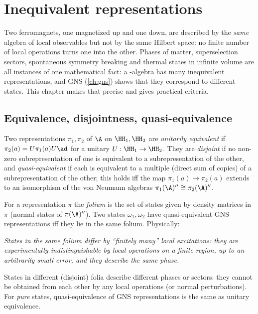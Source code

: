 \chapter{Inequivalent representations}\label{ch:inequiv}

\begin{physmotiv}
Two ferromagnets, one magnetized up and one down, are described by the \emph{same} algebra of local observables but not by the same Hilbert space: no finite number of local operations turns one into the other. Phases of matter, superselection sectors, spontaneous symmetry breaking and thermal states in infinite volume are all instances of one mathematical fact: a \cstar-algebra has many inequivalent representations, and GNS (\cref{ch:gns}) shows that they correspond to different states. This chapter makes that precise and gives practical criteria.
\end{physmotiv}

\section{Equivalence, disjointness, quasi-equivalence}

Two representations $\pi_1,\pi_2$ of $\A$ on $\HH_1,\HH_2$ are \emph{unitarily equivalent} if $\pi_2(a)=U\pi_1(a)U\ad$ for a unitary $U:\HH_1\to\HH_2$. They are \emph{disjoint} if no non-zero subrepresentation of one is equivalent to a subrepresentation of the other, and \emph{quasi-equivalent} if each is equivalent to a multiple (direct sum of copies) of a subrepresentation of the other; this holds iff the map $\pi_1(a)\mapsto\pi_2(a)$ extends to an isomorphism of the von Neumann algebras $\pi_1(\A)''\cong\pi_2(\A)''$.

For a representation $\pi$ the \emph{folium} is the set of states given by density matrices in $\pi$ (normal states of $\pi(\A)''$). Two states $\omega_1,\omega_2$ have quasi-equivalent GNS representations iff they lie in the same folium. Physically:

\begin{center}
\emph{States in the same folium differ by ``finitely many'' local excitations: they are experimentally indistinguishable by local operations on a finite region, up to an arbitrarily small error, and they describe the same phase.}
\end{center}
States in different (disjoint) folia describe different phases or sectors: they cannot be obtained from each other by any local operations (or normal perturbations). For \emph{pure} states, quasi-equivalence of GNS representations is the same as unitary equivalence.

